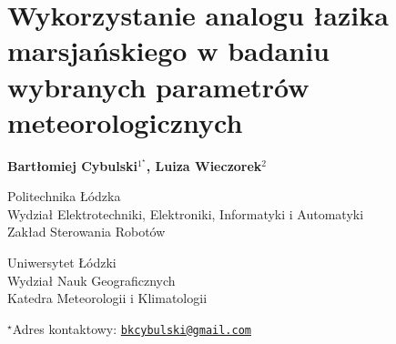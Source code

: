 \documentclass[\main/boa.tex]{subfiles}
\begin{document}
\section{Wykorzystanie analogu łazika marsjańskiego w badaniu wybranych parametrów meteorologicznych}

\begin{center}
  {\bf {} Bartłomiej Cybulski$^{1^\star}$,   Luiza Wieczorek$^{2}$}
\end{center}

\vskip 0.3cm

\begin{affiliations}
\begin{enumerate}
\begin{minipage}{0.915\textwidth}
\centering
\item Politechnika Łódzka\\ Wydział Elektrotechniki, Elektroniki, Informatyki i Automatyki\\ Zakład Sterowania Robotów
\item Uniwersytet Łódzki \\ Wydział Nauk Geograficznych \\ Katedra Meteorologii i Klimatologii\\[-2pt]
\end{minipage}
\end{enumerate}
$^\star$Adres kontaktowy: \href{mailto:bkcybulski@gmail.com}{\nolinkurl{bkcybulski@gmail.com}}\\
\end{affiliations}

\vskip 0.5cm


\vskip 0.5cm
\end{document}
